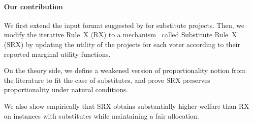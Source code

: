 \documentclass[runningheads]{llncs}
\newcommand{\kibitz}[2]{\ifnum\Comments=1{\color{#1}{#2}}\fi}
\newcommand{\rmr}[1]{\kibitz{red}{[Reshef says:#1]}}
\newcommand{\rf}[1]{\kibitz{blue}{[Roy says:#1]}}
\begin{document}
\paragraph{Our contribution} 
We first extend the input format suggested by \citet{jain2020participatory} for substitute projects. Then, we modify the iterative Rule~X (RX) to a mechanism~\cite{peters2020proportionality} called Substitute Rule~X (SRX) by updating the utility of the projects for each voter according to their reported marginal utility functions.


On the theory side,  we define a weakened version of proportionality notion from the literature to fit the case of substitutes, and prove SRX preserves proportionality under natural conditions. 

We also show empirically that SRX obtains substantially higher welfare than RX on instances with substitutes while maintaining a fair allocation.


\end{document}
